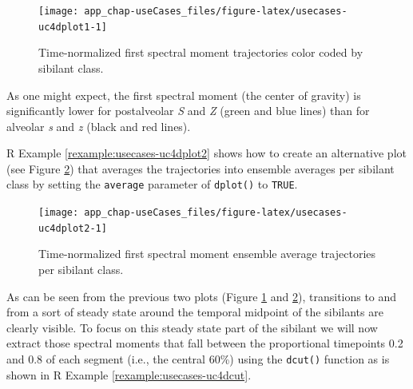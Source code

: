 \documentclass[]{book}
\newenvironment{Shaded}{\begin{snugshade}}{\end{snugshade}}
\newcommand{\DataTypeTok}[1]{\textcolor[rgb]{0.13,0.29,0.53}{#1}}
\newcommand{\DecValTok}[1]{\textcolor[rgb]{0.00,0.00,0.81}{#1}}
\newcommand{\KeywordTok}[1]{\textcolor[rgb]{0.13,0.29,0.53}{\textbf{#1}}}
\newcommand{\NormalTok}[1]{#1}
\newcommand{\OperatorTok}[1]{\textcolor[rgb]{0.81,0.36,0.00}{\textbf{#1}}}
\newcommand{\OtherTok}[1]{\textcolor[rgb]{0.56,0.35,0.01}{#1}}
\newcommand{\StringTok}[1]{\textcolor[rgb]{0.31,0.60,0.02}{#1}}
\theoremstyle{definition}
\theoremstyle{definition}
\theoremstyle{definition}
\theoremstyle{remark}
\begin{document}
\begin{figure}

{\centering \texttt{[image: app\_chap-useCases\_files/figure-latex/usecases-uc4dplot1-1]} 

}

\caption{Time-normalized first spectral moment trajectories color coded by sibilant class.}\label{fig:usecases-uc4dplot1}
\end{figure}

As one might expect, the first spectral moment (the center of gravity)
is significantly lower for postalveolar \emph{S} and \emph{Z} (green and
blue lines) than for alveolar \emph{s} and \emph{z} (black and red
lines).

R Example \ref{rexample:usecases-uc4dplot2} shows how to create an
alternative plot (see Figure \ref{fig:usecases-uc4dplot2}) that averages
the trajectories into ensemble averages per sibilant class by setting
the \texttt{average} parameter of \texttt{dplot()} to \texttt{TRUE}.

\begin{Shaded}
\end{Shaded}

\begin{figure}

{\centering \texttt{[image: app\_chap-useCases\_files/figure-latex/usecases-uc4dplot2-1]} 

}

\caption{Time-normalized first spectral moment ensemble average trajectories per sibilant class.}\label{fig:usecases-uc4dplot2}
\end{figure}

As can be seen from the previous two plots (Figure
\ref{fig:usecases-uc4dplot1} and \ref{fig:usecases-uc4dplot2}),
transitions to and from a sort of steady state around the temporal
midpoint of the sibilants are clearly visible. To focus on this steady
state part of the sibilant we will now extract those spectral moments
that fall between the proportional timepoints 0.2 and 0.8 of each
segment (i.e., the central 60\%) using the \texttt{dcut()} function as
is shown in R Example \ref{rexample:usecases-uc4dcut}.
\end{document}
